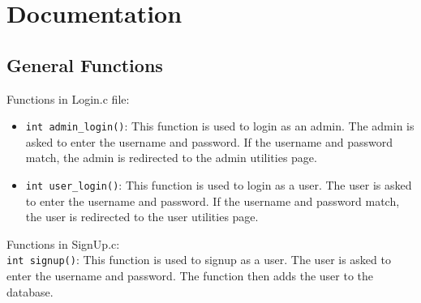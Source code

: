 \documentclass[a4paper]{scrartcl}
\begin{document}
\section{Documentation}
\subsection{General Functions}
Functions in Login.c file:
\begin{itemize}
    \item \texttt{int admin\_login()}: This function is used to login as an admin. The admin is asked to enter the username and password. If the username and password match, the admin is redirected to the admin utilities page.\\
    \item \texttt{int user\_login()}: This function is used to login as a user. The user is asked to enter the username and password. If the username and password match, the user is redirected to the user utilities page.\\
\end{itemize}
Functions in SignUp.c: \\[0.2cm]
\texttt{int signup()}: This function is used to signup as a user. The user is asked to enter the username and password. The function then adds the user to the database.\\
\end{document}
